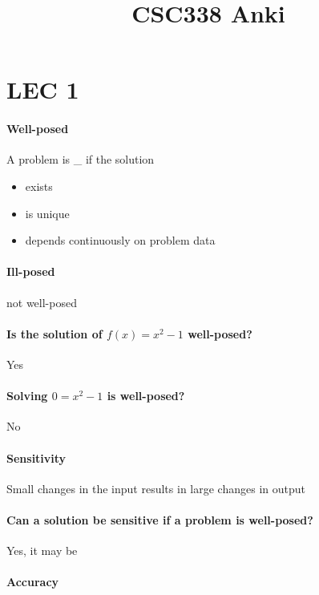\documentclass[12pt]{article}
\begin{document}
\title{CSC338 Anki}
\maketitle

\section{LEC 1}

\paragraph{Well-posed}

A problem is \_ if the solution
\begin{itemize}
    \item exists
    \item is unique
    \item depends continuously on problem data
\end{itemize}

\paragraph{Ill-posed}

not well-posed

\paragraph{Is the solution of $f(x) = x^2 - 1$ well-posed?}

Yes

\paragraph{Solving $0 = x^2 - 1$ is well-posed?}

No

\paragraph{Sensitivity}

Small changes in the input results in large changes in output

\paragraph{Can a solution be sensitive if a problem is well-posed?}

Yes, it may be

\paragraph{Accuracy}
\end{document}
